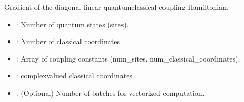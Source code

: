 \documentclass[letterpaper,10pt,english]{sphinxmanual}
\begin{document}
\begin{fulllineitems}
\label{\detokenize{software_reference/ingredients/ingredients:qc_lab.ingredients.diagonal_linear_dh_qc_dzc}}
\pysigstartsignatures
\pysiglinewithargsret
{}
{\sphinxparamcomma {}\sphinxparamcomma {}\sphinxparamcomma {}}
{}
\pysigstopsignatures
\sphinxAtStartPar
Gradient of the diagonal linear quantum\sphinxhyphen{}classical coupling Hamiltonian.
\begin{description}
\begin{itemize}
\item {} 
\sphinxAtStartPar
{}: Number of quantum states (sites).

\item {} 
\sphinxAtStartPar
{}: Number of classical coordinates

\item {} 
\sphinxAtStartPar
{}: Array of coupling constants (num\_sites, num\_classical\_coordinates).

\end{itemize}

\begin{itemize}
\item {} 
\sphinxAtStartPar
{}: complex\sphinxhyphen{}valued classical coordinates.

\item {} 
\sphinxAtStartPar
{}: (Optional) Number of batches for vectorized computation.

\end{itemize}

\end{description}

\end{fulllineitems}

\end{document}
